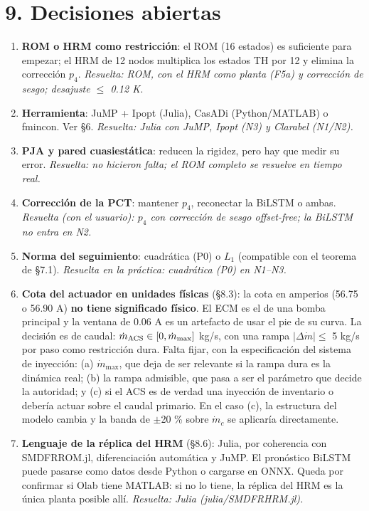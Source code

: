 \documentclass[11pt,a4paper]{article}
\newcommand{\codeus}{\textunderscore\allowbreak}
\newcommand{\code}[1]{{\small\ttfamily\let\_\codeus #1}}
\begin{document}
\medskip
\section*{9. Decisiones abiertas}
\begin{enumerate}
\item \textbf{ROM o HRM como restricción}: el ROM (16 estados) es suficiente para empezar; el HRM de 12 nodos multiplica los estados TH por 12 y elimina la corrección $p_4$. \emph{Resuelta: ROM, con el HRM como planta (F5a) y corrección de sesgo; desajuste $\le$ 0.12 K.}
\item \textbf{Herramienta}: JuMP + Ipopt (Julia), CasADi (Python/MATLAB) o fmincon. Ver \S{}6. \emph{Resuelta: Julia con JuMP, Ipopt (N3) y Clarabel (N1/N2).}
\item \textbf{PJA y pared cuasiestática}: reducen la rigidez, pero hay que medir su error. \emph{Resuelta: no hicieron falta; el ROM completo se resuelve en tiempo real.}
\item \textbf{Corrección de la PCT}: mantener $p_4$, reconectar la BiLSTM o ambas. \emph{Resuelta (con el usuario): $p_4$ con corrección de sesgo offset-free; la BiLSTM no entra en N2.}
\item \textbf{Norma del seguimiento}: cuadrática (P0) o $L_1$ (compatible con el teorema de \S{}7.1). \emph{Resuelta en la práctica: cuadrática (P0) en N1–N3.}
\item \textbf{Cota del actuador en unidades físicas} (\S{}8.3): la cota en amperios (56.75 o 56.90 A) \textbf{no tiene significado físico}. El ECM es el de una bomba principal y la ventana de 0.06 A es un artefacto de usar el pie de su curva. La decisión es de caudal: $\dot m_{\rm ACS}\in[0,\dot m_{\max}]$ kg/s, con una rampa $\lvert\Delta\dot m\rvert\le$ 5 kg/s por paso como restricción dura. Falta fijar, con la especificación del sistema de inyección: (a) $\dot m_{\max}$, que deja de ser relevante si la rampa dura es la dinámica real; (b) la rampa admisible, que pasa a ser el parámetro que decide la autoridad; y (c) si el ACS es de verdad una inyección de inventario o debería actuar sobre el caudal primario. En el caso (c), la estructura del modelo cambia y la banda de $\pm$20 \% sobre $\dot m_c$ se aplicaría directamente.
\item \textbf{Lenguaje de la réplica del HRM} (\S{}8.6): Julia, por coherencia con \code{SMDFRROM.jl}, diferenciación automática y JuMP. El pronóstico BiLSTM puede pasarse como datos desde Python o cargarse en ONNX. Queda por confirmar si Olab tiene MATLAB: si no lo tiene, la réplica del HRM es la única planta posible allí. \emph{Resuelta: Julia (\code{julia/SMDFRHRM.jl}).}

\end{enumerate}
\end{document}
